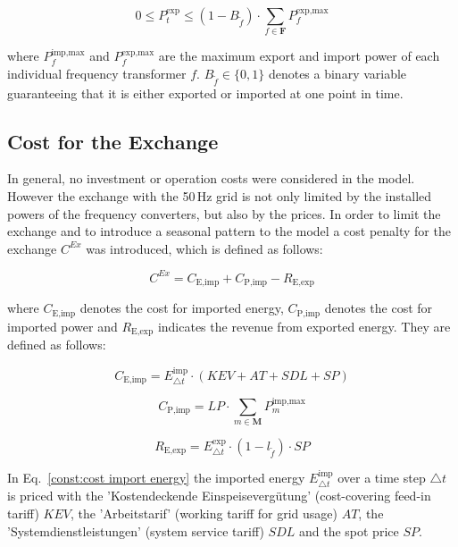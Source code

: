 \begin{equation}\label{const:import boundary}
    0 \leq P^{\text{exp}}_{t} \leq (1-B_{\tilde{f}}) \cdot \sum_{f \in \textbf{F}} P^{\text{exp,max}}_{f}
\end{equation}

\noindent where $P^{\text{imp,max}}_{f}$ and $P^{\text{exp,max}}_{f}$ are the maximum export and import power of each individual frequency transformer $f$. $B_{\tilde{f}} \in \{0,1\}$ denotes a binary variable guaranteeing that it is either exported or imported at one point in time. 

\subsection{Cost for the Exchange}
In general, no investment or operation costs were considered in the model. However the exchange with the 50\,Hz grid is not only limited by the installed powers of the frequency converters, but also by the prices. In order to limit the exchange and to introduce a seasonal pattern to the model a cost penalty for the exchange $C^{Ex}$ was introduced, which is defined as follows: 

\begin{equation}\label{const:cost}
    C^{Ex} =  C_\text{E,imp} + C_\text{P,imp} - R_\text{E,exp}
\end{equation}

\noindent where  $C_\text{E,imp}$ denotes the cost for imported energy, $C_\text{P,imp}$ denotes the cost for imported power and $R_\text{E,exp}$ indicates the revenue from exported energy. They are defined as follows:

\begin{equation}\label{const:cost import energy}
    C_\text{E,imp} = E^{\text{imp}}_{\triangle t} \cdot (KEV + AT + SDL + SP)
\end{equation}

\begin{equation}\label{const:cost import power}
    C_\text{P,imp} = LP \cdot \sum_{m \in \textbf{M}} P^\text{imp,max}_{m} 
\end{equation}

\begin{equation}\label{const:revenue export energy}
    R_\text{E,exp} = E^{\text{exp}}_{\triangle t} \cdot (1-l_{\tilde{f}}) \cdot SP
\end{equation}

\noindent In Eq.~\eqref{const:cost import energy} the imported energy $E^{\text{imp}}_{\triangle t}$ over a time step $\triangle t$ is priced with the 'Kostendeckende Einspeisevergütung' (cost-covering feed-in tariff) $KEV$, the 'Arbeitstarif' (working tariff for grid usage) $AT$, the 'Systemdienstleistungen' (system service tariff) $SDL$ and the spot price $SP$. 

